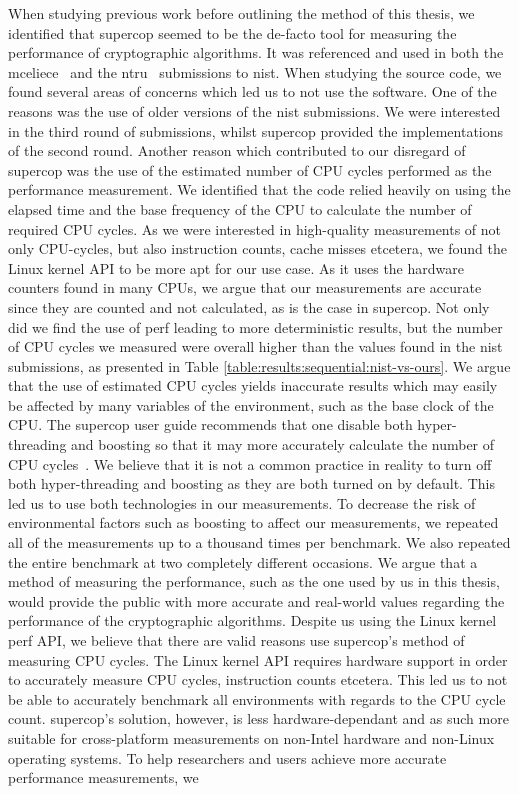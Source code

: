 When studying previous work before outlining the method of this thesis, we identified that \gls{supercop} seemed to be the de-facto tool for measuring the performance of cryptographic algorithms. It was referenced and used in both the \gls{mceliece}~\cite{mceliece2020} and the \gls{ntru}~\cite{ntru2020} submissions to \gls{nist}. When studying the source code, we found several areas of concerns which led us to not use the software. One of the reasons was the use of older versions of the \gls{nist} submissions. We were interested in the third round of submissions, whilst \gls{supercop} provided the implementations of the second round. Another reason which contributed to our disregard of \gls{supercop} was the use of the estimated number of CPU cycles performed as the performance measurement. We identified that the code relied heavily on using the elapsed time and the base frequency of the CPU to calculate the number of required CPU cycles. As we were interested in high-quality measurements of not only CPU-cycles, but also instruction counts, cache misses etcetera, we found the Linux kernel API to be more apt for our use case. As it uses the hardware counters found in many CPUs, we argue that our measurements are accurate since they are counted and not calculated, as is the case in \gls{supercop}. Not only did we find the use of perf leading to more deterministic results, but the number of CPU cycles we measured were overall higher than the values found in the \gls{nist} submissions, as presented in Table \ref{table:results:sequential:nist-vs-ours}. We argue that the use of estimated CPU cycles yields inaccurate results which may easily be affected by many variables of the environment, such as the base clock of the CPU. The \gls{supercop} user guide recommends that one disable both hyper-threading and boosting so that it may more accurately calculate the number of CPU cycles~\cite{supercop}. We believe that it is not a common practice in reality to turn off both hyper-threading and boosting as they are both turned on by default. This led us to use both technologies in our measurements. To decrease the risk of environmental factors such as boosting to affect our measurements, we repeated all of the measurements up to a thousand times per benchmark. We also repeated the entire benchmark at two completely different occasions. We argue that a method of measuring the performance, such as the one used by us in this thesis, would provide the public with more accurate and real-world values regarding the performance of the cryptographic algorithms. Despite us using the Linux kernel perf API, we believe that there are valid reasons use \gls{supercop}'s method of measuring CPU cycles. The Linux kernel API requires hardware support in order to accurately measure CPU cycles, instruction counts etcetera. This led us to not be able to accurately benchmark all environments with regards to the CPU cycle count. \gls{supercop}'s solution, however, is less hardware-dependant and as such more suitable for cross-platform measurements on non-Intel hardware and non-Linux operating systems. To help researchers and users achieve more accurate performance measurements, we 